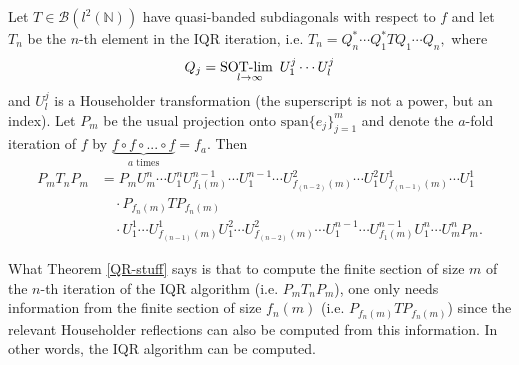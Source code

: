 \documentclass[a4paper,10pt]{article}
\begin{document}
\begin{theorem}\label{QR-stuff}
Let $T \in \mathcal{B}(l^2(\mathbb{N}))$ have quasi-banded subdiagonals with respect to $f$ and let 
 $T_n$ be the $n$-th element in the IQR iteration, i.e.
$
T_n = Q^*_n \cdots Q^*_1 T Q_1 \cdots Q_n,
$
where 
$$
Q_j = \underset{l \rightarrow \infty}{\text{SOT-lim \,}} U^j_1\cdots U^j_l
$$ and $U^j_l$ is a Householder transformation (the superscript is not a power, but an index). 
Let $P_m$ be the usual projection onto $\mathrm{span}\{e_j\}_{j=1}^m$ and denote the $a$-fold iteration of $f$ by $\underbrace{f\circ{}f\circ{}...\circ{}f}_{a\text{ times}}=f_a$.
Then
\begin{equation}\label{second_appl}
\begin{split}
P_mT_nP_m &= P_m
U^n_m\cdots U^n_1U^{n-1}_{f_1(m)}\cdots U^{n-1}_1\cdots U^2_{f_{(n-2)}(m)}\cdots U^2_1 U^1_{f_{(n-1)}(m)}\cdots
  U^1_1 \\ 
  & \quad \cdot P_{f_{n}(m)} T  P_{f_{n}(m)} \\
  & \quad \cdot U^1_1 \cdots  U^1_{f_{(n-1)}(m)} U^2_1  \cdots U^2_{f_{(n-2)}(m)}
  \cdots U^{n-1}_1\cdots U^{n-1}_{f_1(m)} U^n_1 \cdots U^n_m P_m.
\end{split}
\end{equation}
\end{theorem}

\begin{remark}
What Theorem \ref{QR-stuff} says is that to compute the finite section of size $m$ of the $n$-th iteration of the IQR algorithm (i.e. $P_mT_nP_m$), one only needs information from the finite section of size $f_{n}(m)$ (i.e. $P_{f_{n}(m)} T  P_{f_{n}(m)}$) since the relevant Householder reflections can also be computed from this information. In other words, the IQR algorithm can be computed.
\end{remark}
\end{document}
